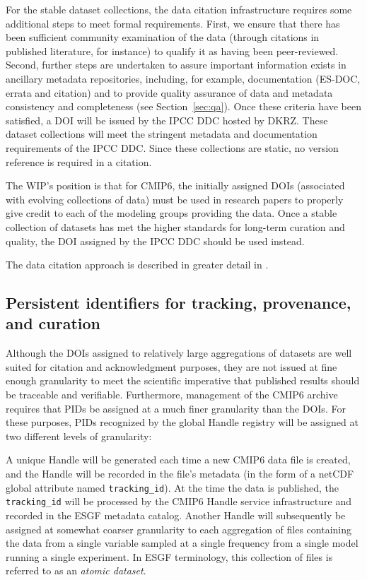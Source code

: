 \documentclass[gmd,manuscript]{copernicus}
\newcommand{\pllabel}[1]{\label{p-#1}\linelabel{l-#1}}
\begin{document}
For the stable dataset collections, the data citation infrastructure
requires some additional steps to meet formal requirements. First, we
ensure that there has been sufficient community examination of the
data
\pllabel{RC1-40}
(through citations in published literature, for instance) to qualify
it as having been peer-reviewed. Second, further steps are undertaken
to assure important information exists in ancillary metadata
repositories, including, for example, documentation (ES-DOC, errata
and citation) and to provide quality assurance of data and metadata
consistency and completeness (see Section~\ref{sec:qa}). Once these
criteria have been satisfied, a DOI will be issued by the IPCC DDC
hosted by DKRZ. These dataset collections will meet the stringent
metadata and documentation requirements of the IPCC DDC. Since these
collections are static, no version reference is required in a
citation.

The WIP's position is that for CMIP6, the initially assigned DOIs
(associated with evolving collections of data) must be used in
research papers to properly give credit to each of the modeling groups
providing the data. Once a stable collection of datasets has met the
higher standards for long-term curation and quality, the DOI assigned
by the IPCC DDC should be used instead.

The data citation approach is described in greater detail in \cite{ref:stockhauselautenschlager2017}.

\subsection{Persistent identifiers for tracking, provenance, and
  curation}
\label{sec:pid}

Although the DOIs assigned to relatively large aggregations of
datasets are well suited for citation and acknowledgment purposes,
they are not issued at fine enough granularity to meet the scientific
imperative that published results should be traceable and verifiable.
Furthermore, management of the CMIP6 archive requires that PIDs be
assigned at a much finer granularity than the DOIs. For these
purposes, PIDs recognized by the global Handle registry will be
assigned at two different levels of granularity:

A unique Handle will be generated each time a new CMIP6 data file is
created, and the Handle will be recorded in the file's metadata (in
the form of a netCDF global attribute named \texttt{tracking\_id}). At
the time the data is published, the \texttt{tracking\_id} will be
processed by the CMIP6 Handle service infrastructure and recorded in
the ESGF metadata catalog. Another Handle will subsequently be
assigned at somewhat coarser granularity to each aggregation of files
containing the data from a single variable sampled at a single
frequency from a single model running a single experiment. In ESGF
terminology, this collection of files is referred to as an
\emph{atomic dataset}.
\end{document}
